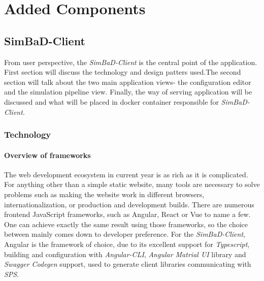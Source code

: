 \chapter{Added Components}
\label{chapter:4}
\section{SimBaD-Client}
From user perspective, the \textit{SimBaD-Client} is the central point of the application. First section will discuss the technology and design patters used.The second section will talk about the two main application views- the configuration editor and the simulation pipeline view. Finally, the way of serving application will be discussed and what will be placed in docker container responsible for \textit{SimBaD-Client}.
\subsection{Technology}
\subsubsection{Overview of frameworks}
The web development ecosystem in current year is as rich as it is complicated. For anything other than a simple static website, many tools are necessary to solve problems such as making the website work in different browsers, internationalization, or production and development builds. There are numerous frontend JavaScript frameworks, such as Angular, React or Vue to name a few. One can achieve exactly the same result using those frameworks, so the choice between mainly comes down to developer preference. For the \textit{SimBaD-Client}, Angular is the framework of choice, due to its excellent support for \textit{Typescript}, building and configuration with \textit{Angular-CLI}, \textit{Angular Matrial UI} library and \textit{Swagger Codegen} support, used to generate client libraries communicating with \textit{SPS}. 
